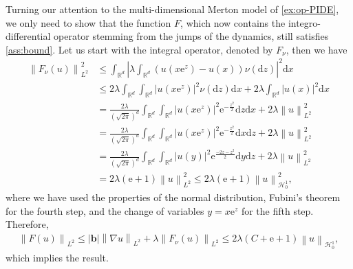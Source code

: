 \documentclass[11pt,a4paper,reqno]{amsart}
\numberwithin{equation}{section}
\theoremstyle{plain}
\theoremstyle{definition}
\def\ud{\mathrm d}
\def\ue{\mathrm e}
\newcommand{\cH}{\mathcal{H}}
\newcommand{\R}{\mathbb{R}}
\newcommand{\norm}[1]{\left\|#1 \right\|} %
\newcommand{\abs}[1]{\left|#1\right|} %
\begin{document}
Turning our attention to the multi-dimensional Merton model of \cref{ex:op-PIDE}, we only need to show that the function $F$, which now contains the integro-differential operator stemming from the jumps of the dynamics, still satisfies \cref{ass:bound}.
Let us start with the integral operator, denoted by $F_\nu$, then we have
\begin{align*}
\norm{F_\nu (u) }_{L^2}^2
    &\le  \int_{\R^d} \abs{ \lambda \int_{\R^d} \left(u\left(x\ue^z\right)-u\left(x\right) \right)\nu\left(\ud z\right)}^2\ud x \\
    &\le 2 \lambda \int_{\R^d}\int_{\R^d} \abs{u\left(x\ue^z\right)}^2\nu\left(\ud z\right)\ud x + 2 \lambda \int_{\R^d} \abs{u\left(x\right)}^2\ud x\\
    &= \frac{2\lambda}{(\sqrt{2\pi})^d}\int_{\R^d}\int_{\R^d} \abs{u\left(x\ue^z\right)}^2\ue^{-\frac{z^2}{2}}\ud z\ud x+2\lambda\norm{u}_{L^2}^2\\
    &= \frac{2\lambda}{(\sqrt{2\pi})^d}\int_{\R^d}\int_{\R^d} \abs{u\left(x\ue^z\right)}^2\ue^{-\frac{z^2}{2}}\ud x\ud z + 2\lambda \norm{u}_{L^2}^2\\
    &= \frac{2\lambda}{(\sqrt{2\pi})^d}\int_{\R^d}\int_{\R^d} \abs{u\left(y\right)}^2\ue^{\frac{-2z-z^2}{2}}\ud y\ud z + 2\lambda\norm{u}_{L^2}^2\\
    &= 2\lambda \left(\ue+1\right)\norm{u}_{L^2}^2
     \le 2\lambda \left(\ue+1\right)\norm{u}_{\cH_0^1 }^2,
\end{align*}
where we have used the properties of the normal distribution, Fubini's theorem for the fourth step, and the change of variables $y=x\ue^z$ for the fifth step.
Therefore,
\begin{align*}
\norm{F(u)}_{L^2}
    \le \abs{\boldsymbol{b}}\norm{\nabla u}_{L^2} +\lambda \norm{F_\nu (u)}_{L^2} 
    \le 2\lambda\left(C+\ue+1\right)\norm{u}_{\cH_0^1 },
\end{align*}
which implies the result.


\end{document}
